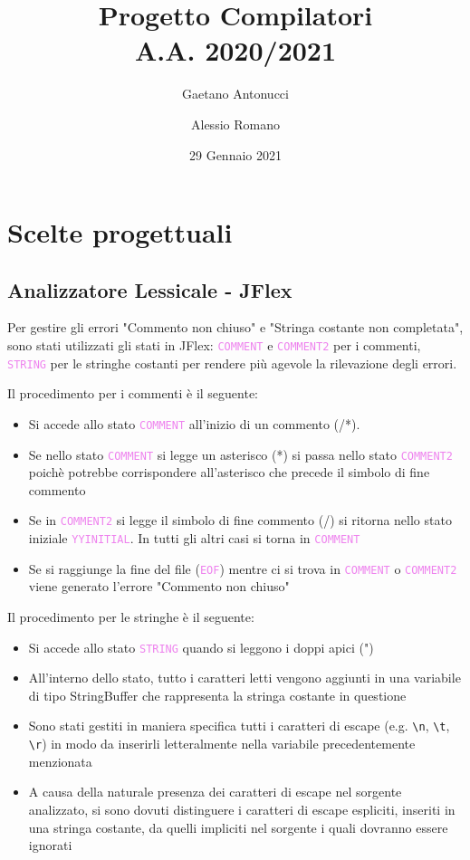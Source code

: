 \documentclass[a4paper,12pt]{article}
\title{Progetto Compilatori \\ \normalsize{A.A. 2020/2021}}
\author{Gaetano Antonucci \and Alessio Romano}
\date{29 Gennaio 2021}
\newcommand\state[1]{\textcolor{violet}{\texttt{#1}}}
\begin{document}
    \maketitle
    \tableofcontents
    \newpage

	\section{Scelte progettuali}
	\subsection{Analizzatore Lessicale - JFlex}
	
	
	Per gestire gli errori "Commento non chiuso" e "Stringa costante non completata", sono stati utilizzati gli stati in JFlex:
	\state{COMMENT} e \state{COMMENT2} per i commenti, \state{STRING} per le stringhe costanti per rendere più agevole la rilevazione degli errori.\newline

	Il procedimento per i commenti è il seguente:
	\begin{itemize}
    	\item Si accede allo stato \state{COMMENT} all'inizio di un commento (/*).
        \item Se nello stato \state{COMMENT} si legge un asterisco (*) si passa nello stato \state{COMMENT2} poichè potrebbe corrispondere all'asterisco
		 		che precede il simbolo di fine commento
		\item Se in \state{COMMENT2} si legge il simbolo di fine commento (/) si ritorna nello stato iniziale \state{YYINITIAL}. In tutti gli altri casi si torna in \state{COMMENT}
		\item Se si raggiunge la fine del file (\state{EOF}) mentre ci si trova in \state{COMMENT} o \state{COMMENT2} viene generato l'errore "Commento non chiuso"
	\end{itemize}

	Il procedimento per le stringhe è il seguente:
	\begin{itemize}
	\item Si accede allo stato \state{STRING} quando si leggono i doppi apici (")
	\item All'interno dello stato, tutto i caratteri letti vengono aggiunti in una variabile di tipo StringBuffer che rappresenta la stringa costante in questione
	\item Sono stati gestiti in maniera specifica tutti i caratteri di escape (e.g. \verb!\n!, \verb!\t!, \verb!\r!) in modo da
            inserirli letteralmente nella variabile precedentemente menzionata
	\item A causa della naturale presenza dei caratteri di escape nel sorgente analizzato, si sono dovuti distinguere i caratteri di escape espliciti, inseriti in una stringa costante,  				da quelli impliciti nel sorgente i quali dovranno essere ignorati
	\end{itemize}
\end{document}
